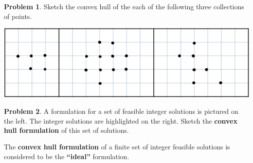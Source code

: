 \documentclass[11pt]{article}
\theoremstyle{definition}
\newtheorem{problem}{Problem}
\begin{document}
\bigskip
\begin{problem}
Sketch the convex hull of the each of the following three collections of points.

\includegraphics[width=.8\textwidth]{convex_hull_practice}
\end{problem}

\bigskip

\begin{problem} A formulation for a set of feasible integer solutions is pictured on the left.  The integer solutions are highlighted on the right.  Sketch the \textbf{convex hull formulation} of this set of solutions.

\vspace{0.5cm}
\begin{center}
\begin{minipage}{6.5in}
\centering
{}
\hspace*{0.2in}
\end{minipage}
\end{center}
\end{problem}

\begin{tcolorbox}
The \textbf{convex hull formulation} of a finite set of integer feasible solutions is considered to be the \textbf{``ideal''} formulation.
\end{tcolorbox}
\end{document}
